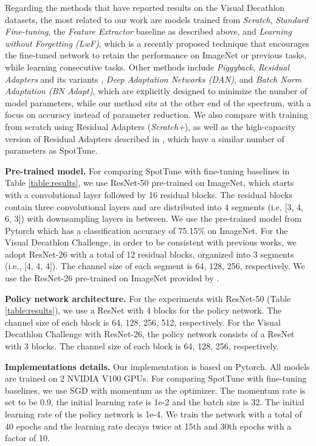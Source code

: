 \documentclass[10pt,twocolumn,letterpaper]{article}
\begin{document}
Regarding the methods that have reported results on the Visual Decathlon datasets, the most related to our work are models trained from {\em Scratch}, {\em Standard Fine-tuning}, the {\em Feature Extractor} baseline as described above, and {\em Learning without Forgetting (LwF)}\cite{li2017learning}, which is a recently proposed technique that encourages the fine-tuned network to retain the performance on ImageNet or previous tasks, while learning consecutive tasks. Other methods include {\em Piggyback}\cite{mallya2018piggyback}, {\em Residual Adapters} and its variants \cite{rebuffi2017learning,rebuffi2018efficient}, {\em Deep Adaptation Networks (DAN)}\cite{rosenfeld2017incremental}, and {\em Batch Norm Adaptation (BN Adapt)}\cite{bilen2017universal}, which are explicitly designed to minimize the number of model parameters, while our method sits at the other end of the spectrum, with a focus on accuracy instead of parameter reduction. We also compare with training from scratch using Residual Adapters ({\em Scratch+}), as well as the high-capacity version of Residual Adapters described in \cite{rebuffi2017learning}, which have a similar number of parameters as SpotTune.

\noindent\textbf{Pre-trained model.} For comparing SpotTune with fine-tuning baselines in Table \ref{table:results}, we use ResNet-50 pre-trained on ImageNet, which starts with a convolutional layer followed by 16 residual blocks. The residual blocks contain three convolutional layers and are distributed into 4 segments (i.e, [3, 4, 6, 3]) with downsampling layers in between. We use the pre-trained model from Pytorch which has a classification accuracy of 75.15\% on ImageNet. For the Visual Decathlon Challenge, in order to be consistent with previous works, we adopt ResNet-26 with a total of 12 residual blocks, organized into 3 segments (i.e., [4, 4, 4]). The channel size of each segment is 64, 128, 256, respectively. We use the ResNet-26 pre-trained on ImageNet provided by \cite{rebuffi2018efficient}.

\vspace{0.05in}\noindent\textbf{Policy network architecture.}
For the experiments with ResNet-50 (Table \ref{table:results}), we use a ResNet with 4 blocks for the policy network. The channel size of each block is 64, 128, 256, 512, respectively. For the Visual Decathlon Challenge with ResNet-26, the policy network consists of a ResNet with 3 blocks. The channel size of each block is 64, 128, 256, respectively. 

\vspace{0.05in}\noindent\textbf{Implementations details.} Our implementation is based on Pytorch. All models are trained on 2 NVIDIA V100 GPUs. For comparing SpotTune with fine-tuning baselines, we use SGD with momentum as the optimizer. The momentum rate is set to be 0.9, the initial learning rate is 1e-2 and the batch size is 32. The initial learning rate of the policy network is 1e-4. We train the network with a total of 40 epochs and the learning rate decays twice at 15th and 30th epochs with a factor of 10.
\end{document}
